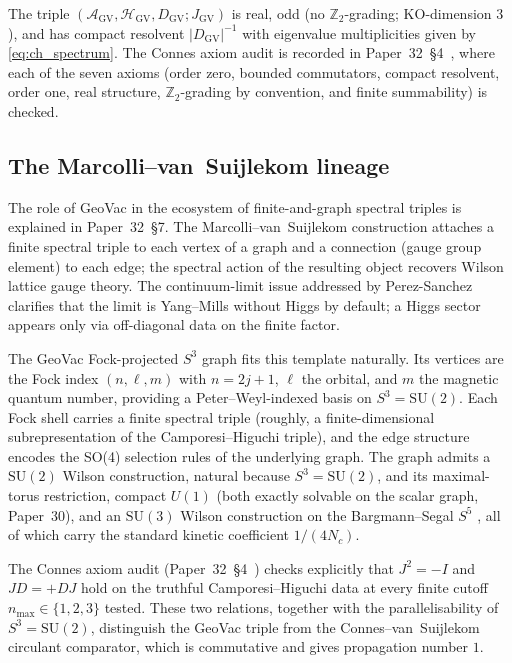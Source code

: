 \documentclass[11pt,a4paper]{article}
\theoremstyle{plain}
\theoremstyle{definition}
\newcommand{\nmax}{n_{\max}}
\newcommand{\sthree}{S^{3}}
\newcommand{\sfive}{S^{5}}
\newcommand{\HGV}{\mathcal{H}_{\mathrm{GV}}}
\newcommand{\AGV}{\mathcal{A}_{\mathrm{GV}}}
\newcommand{\DGV}{D_{\mathrm{GV}}}
\newcommand{\Z}{\mathbb{Z}}
\newcommand{\SU}{\mathrm{SU}}
\begin{document}
The triple $(\AGV, \HGV, \DGV; J_{\mathrm{GV}})$ is real, odd
(no $\Z_{2}$-grading; KO-dimension $3$), and has compact resolvent
$|\DGV|^{-1}$ with eigenvalue multiplicities given by
\eqref{eq:ch_spectrum}.  The Connes axiom audit is recorded in
Paper~32~\S 4~\cite{paper32}, where each of the seven axioms (order
zero, bounded commutators, compact resolvent, order one, real
structure, $\Z_{2}$-grading by convention, and finite summability)
is checked.

\subsection{The Marcolli--van~Suijlekom lineage}

The role of GeoVac in the ecosystem of finite-and-graph spectral
triples is explained in Paper~32~\S 7.  The Marcolli--van~Suijlekom
construction \cite{marcolli_vs2014} attaches a finite spectral
triple to each vertex of a graph and a connection (gauge group
element) to each edge; the spectral action of the resulting object
recovers Wilson lattice gauge theory.  The continuum-limit issue
addressed by Perez-Sanchez \cite{perez_sanchez2025}
clarifies that the limit is Yang--Mills without
Higgs by default; a Higgs sector appears only via off-diagonal data
on the finite factor.

The GeoVac Fock-projected $\sthree$ graph fits this template
naturally.  Its vertices are the Fock index $(n, \ell, m)$ with
$n = 2j + 1$, $\ell$ the orbital, and $m$ the magnetic quantum
number, providing a Peter--Weyl-indexed basis on $\sthree = \SU(2)$.
Each Fock shell carries a finite spectral triple
(roughly, a finite-dimensional subrepresentation of the
Camporesi--Higuchi triple), and the edge structure encodes the
SO(4) selection rules of the underlying graph.  The graph admits a
$\SU(2)$ Wilson construction, natural because $\sthree = \SU(2)$, and
its maximal-torus restriction, compact $U(1)$ (both exactly solvable on
the scalar graph, Paper~30), and an $\SU(3)$ Wilson construction on the
Bargmann--Segal $\sfive$ \cite{paper24}, all of which carry the standard
kinetic coefficient $1/(4 N_{c})$.

The Connes axiom audit (Paper~32~\S 4~\cite{paper32}) checks
explicitly that $J^{2} = -I$ and $JD = +DJ$ hold on the truthful
Camporesi--Higuchi data at every finite cutoff
$\nmax \in \{1, 2, 3\}$ tested.  These two relations, together with
the parallelisability of $\sthree = \SU(2)$, distinguish the
GeoVac triple from the Connes--van~Suijlekom circulant comparator,
which is commutative and gives propagation number $1$.
\end{document}
